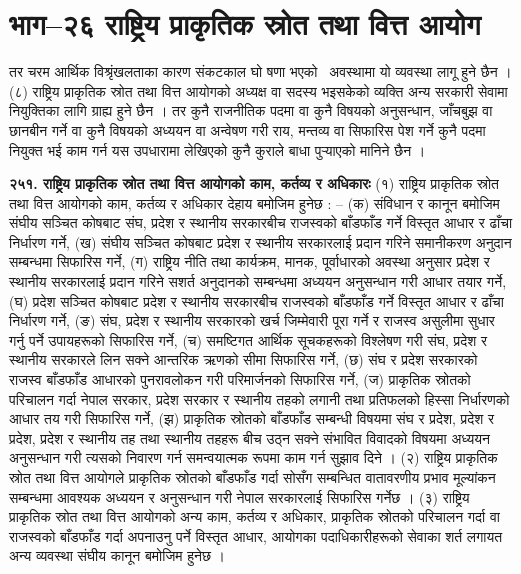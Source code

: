 \section{भाग–२६ राष्ट्रिय प्राकृतिक स्रोत तथा वित्त आयोग}

तर चरम आर्थिक विश्रृंखलताका कारण संकटकाल घो षणा भएको  अवस्थामा यो व्यवस्था लागू हुने छैन ।
(८) राष्ट्रिय प्राकृतिक स्रोत तथा वित्त आयोगको अध्यक्ष वा सदस्य भइसकेको व्यक्ति अन्य सरकारी सेवामा नियुक्तिका लागि ग्राह्य हुने छैन ।
तर कुनै राजनीतिक पदमा वा कुनै विषयको अनुसन्धान, जाँचबुझ वा छानबीन गर्ने वा कुनै विषयको अध्ययन वा अन्वेषण गरी राय, मन्तव्य वा सिफारिस पेश गर्ने कुनै पदमा नियुक्त भई काम गर्न यस उपधारामा लेखिएको कुनै कुराले बाधा पुर्‍याएको मानिने छैन ।

\textbf{२५१. राष्ट्रिय प्राकृतिक स्रोत तथा वित्त आयोगको काम, कर्तव्य र अधिकारः} (१) राष्ट्रिय प्राकृतिक स्रोत तथा वित्त आयोगको काम, कर्तव्य र अधिकार देहाय बमोजिम हुनेछ : –
(क) संविधान र कानून बमोजिम संघीय सञ्चित कोषबाट संघ, प्रदेश र स्थानीय सरकारबीच राजस्वको बाँडफाँड गर्ने विस्तृत आधार र ढाँचा निर्धारण गर्ने,
(ख) संघीय सञ्चित कोषबाट प्रदेश र स्थानीय सरकारलाई प्रदान गरिने समानीकरण अनुदान सम्बन्धमा सिफारिस गर्ने,
(ग) राष्ट्रिय नीति तथा कार्यक्रम, मानक, पूर्वाधारको अवस्था अनुसार प्रदेश र स्थानीय सरकारलाई प्रदान गरिने सशर्त अनुदानको सम्बन्धमा अध्ययन अनुसन्धान गरी आधार तयार गर्ने,
(घ) प्रदेश सञ्चित कोषबाट प्रदेश र स्थानीय सरकारबीच राजस्वको बाँडफाँड गर्ने विस्तृत आधार र ढाँचा निर्धारण गर्ने,
(ङ) संघ, प्रदेश र स्थानीय सरकारको खर्च जिम्मेवारी पूरा गर्ने र राजस्व असुलीमा सुधार गर्नु पर्ने उपायहरूको सिफारिस गर्ने,
(च) समष्टिगत आर्थिक सूचकहरूको विश्लेषण गरी संघ, प्रदेश र स्थानीय सरकारले लिन सक्ने आन्तरिक ऋणको सीमा सिफारिस गर्ने,
(छ) संघ र प्रदेश सरकारको राजस्व बाँडफाँड आधारको पुनरावलोकन गरी परिमार्जनको सिफारिस गर्ने,
(ज) प्राकृतिक स्रोतको परिचालन गर्दा नेपाल सरकार, प्रदेश सरकार र स्थानीय तहको लगानी तथा प्रतिफलको हिस्सा निर्धारणको आधार तय गरी सिफारिस गर्ने,
(झ) प्राकृतिक स्रोतको बाँडफाँड सम्बन्धी विषयमा संघ र प्रदेश, प्रदेश र प्रदेश, प्रदेश र स्थानीय तह तथा स्थानीय तहहरू बीच उठ्न सक्ने संभावित विवादको विषयमा अध्ययन अनुसन्धान गरी त्यसको निवारण गर्न समन्वयात्मक रूपमा काम गर्न सुझाव दिने ।
(२) राष्ट्रिय प्राकृतिक स्रोत तथा वित्त आयोगले प्राकृतिक स्रोतको बाँडफाँड गर्दा सोसँग सम्बन्धित वातावरणीय प्रभाव मूल्यांकन सम्बन्धमा आवश्यक अध्ययन र अनुसन्धान गरी नेपाल सरकारलाई सिफारिस गर्नेछ ।
(३) राष्ट्रिय प्राकृतिक स्रोत तथा वित्त आयोगको अन्य काम, कर्तव्य र अधिकार, प्राकृतिक स्रोतको परिचालन गर्दा वा राजस्वको बाँडफाँड गर्दा अपनाउनु पर्ने विस्तृत आधार, आयोगका पदाधिकारीहरूको सेवाका शर्त लगायत अन्य व्यवस्था संघीय कानून बमोजिम हुनेछ ।